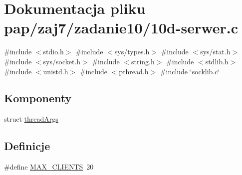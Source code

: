 \hypertarget{10d-serwer_8c}{}\section{Dokumentacja pliku pap/zaj7/zadanie10/10d-\/serwer.c}
\label{10d-serwer_8c}
{\ttfamily \#include $<$stdio.\+h$>$}\newline
{\ttfamily \#include $<$sys/types.\+h$>$}\newline
{\ttfamily \#include $<$sys/stat.\+h$>$}\newline
{\ttfamily \#include $<$sys/socket.\+h$>$}\newline
{\ttfamily \#include $<$string.\+h$>$}\newline
{\ttfamily \#include $<$stdlib.\+h$>$}\newline
{\ttfamily \#include $<$unistd.\+h$>$}\newline
{\ttfamily \#include $<$pthread.\+h$>$}\newline
{\ttfamily \#include \char`\"{}socklib.\+c\char`\"{}}\newline
\subsection*{Komponenty}
\begin{DoxyCompactItemize}
\item 
struct \mbox{\hyperlink{structthreadArgs}{thread\+Args}}
\end{DoxyCompactItemize}
\subsection*{Definicje}
\begin{DoxyCompactItemize}
\item 
\#define \mbox{\hyperlink{10d-serwer_8c_a0a8f91f93d75a07f0ae45077db45b3eb}{M\+A\+X\+\_\+\+C\+L\+I\+E\+N\+TS}}~20
\end{DoxyCompactItemize}
